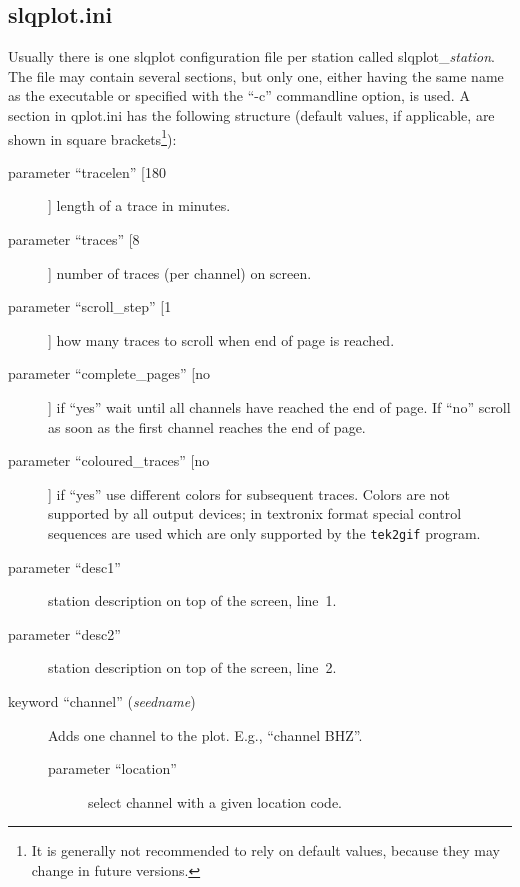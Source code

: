 \documentclass[11pt,a4paper,titlepage]{article}
\begin{document}
\newcommand{\dfl}[1]{[#1]}

\subsection{slqplot.ini}\label{slqplotini}

Usually there is one slqplot configuration file per station called
slqplot\_\textit{station}. The file may contain several sections, but only
one, either having the same name as the executable or specified with the
``-c'' commandline option, is used. A section in qplot.ini has the
following structure (default values, if applicable, are shown in square
brackets\footnote{It is generally not recommended to rely on default
values, because they may change in future versions.}):
\begin{description}
\item[parameter ``tracelen'' \dfl{180}] length of a trace in minutes.

\item[parameter ``traces'' \dfl{8}] number of traces (per channel) on
screen.

\item[parameter ``scroll\_step'' \dfl{1}] how many traces to scroll when
end of page is reached.

\item[parameter ``complete\_pages'' \dfl{no}] if ``yes'' wait until all
channels have reached the end of page. If ``no'' scroll as soon as the
first channel reaches the end of page.

\item[parameter ``coloured\_traces'' \dfl{no}] if ``yes'' use different
colors for subsequent traces. Colors are not supported by all output
devices; in textronix format special control sequences are used which are
only supported by the \verb+tek2gif+ program.

\item[parameter ``desc1''] station description on top of the screen, line~1.

\item[parameter ``desc2''] station description on top of the screen, line~2.

\item[keyword ``channel'' (\textit{seedname})] Adds one channel to the
plot. E.g., ``channel BHZ''.

\begin{description}
\item[parameter ``location''] select channel with a given location code.


\end{description}
\end{description}
\end{document}
